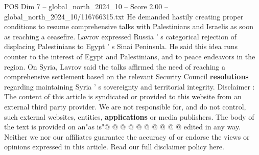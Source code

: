 \begin{textsample}{POS Dim 7 – global\_north\_2024\_10 – Score 2.00 – global\_north\_2024\_10/116766315.txt}
He demanded hastily creating proper conditions to resume comprehensive talks with Palestinians and Israelis as soon as reaching a ceasefire.
Lavrov expressed Russia ' s categorical rejection of displacing Palestinians to Egypt ' s Sinai Peninsula.
He said this idea runs counter to the interest of Egypt and Palestinians, and to peace endeavors in the region.
On Syria, Lavrov said the talks affirmed the need of reaching a comprehensive settlement based on the relevant Security Council \textbf{resolutions} regarding maintaining Syria ' s sovereignty and territorial integrity.
Disclaimer : The content of this article is syndicated or provided to this website from an external third party provider.
We are not responsible for, and do not control, such external websites, entities, \textbf{applications} or media publishers.
The body of the text is provided on an"as is"@ @ @ @ @ @ @ @ @ @ edited in any way.
Neither we nor our affiliates guarantee the accuracy of or endorse the views or opinions expressed in this article.
Read our full disclaimer policy here.

\end{textsample}
